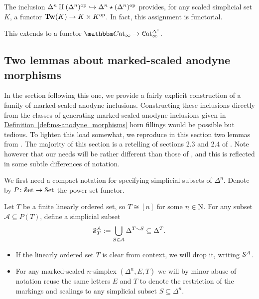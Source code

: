 \documentclass[main.tex]{subfiles}
\begin{document}
The inclusion $\Delta^{n} \amalg (\Delta^{n})\op \hookrightarrow \Delta^{n} \star (\Delta^{n})\op$ provides, for any scaled simplicial set $K$, a functor $\Tw(K) \to K \times K\op$. In fact, this assignment is functorial.

\begin{proposition}
  This extends to a functor $\ICCat \to \ICat^{\Delta^{1}}$.
\end{proposition}

\subsection{Two lemmas about marked-scaled anodyne morphisms}
\label{ssc:two_lemmas_about_marked_scaled_anodyne_morphisms}

In the section following this one, we provide a fairly explicit construction of a family of marked-scaled anodyne inclusions. Constructing these inclusions directly from the classes of generating marked-scaled anodyne inclusions given in \hyperref[def:ms-anodyne_morphisms]{Definition~\ref*{def:ms-anodyne_morphisms}} horn fillings would be possible but tedious. To lighten this load somewhat, we reproduce in this section two lemmas from \cite{garcia2cartesianfibrationsii}. The majority of this section is a retelling of sections 2.3 and 2.4 of \cite{garcia2cartesianfibrationsii}. Note however that our needs will be rather different than those of \cite{garcia2cartesianfibrationsii}, and this is reflected in some subtle differences of notation.

We first need a compact notation for specifying simplicial subsets of $\Delta^{n}$. Denote by $P\colon \Set \to \Set$ the power set functor.

\begin{definition}
  Let $T$ be a finite linearly ordered set, so $T \cong [n]$ for some $n \in \N$. For any subset $\mathcal{A} \subseteq  P(T)$, define a simplicial subset
  \begin{equation*}
    \S^{\mathcal{A}}_{T} := \bigcup_{S \in \mathcal{A}} \Delta^{T \smallsetminus S} \subseteq \Delta^{T}.
  \end{equation*}
\end{definition}

\begin{notation}
  \leavevmode
  \begin{itemize}
    \item If the linearly ordered set $T$ is clear from context, we will drop it, writing $\S^{\mathcal{A}}$.

    \item For any marked-scaled $n$-simplex $(\Delta^{n}, E, T)$ we will by minor abuse of notation reuse the same letters $E$ and $T$ to denote the restriction of the markings and scalings to any simplicial subset $S \subseteq \Delta^{n}$.
  \end{itemize}
\end{notation}
\end{document}
